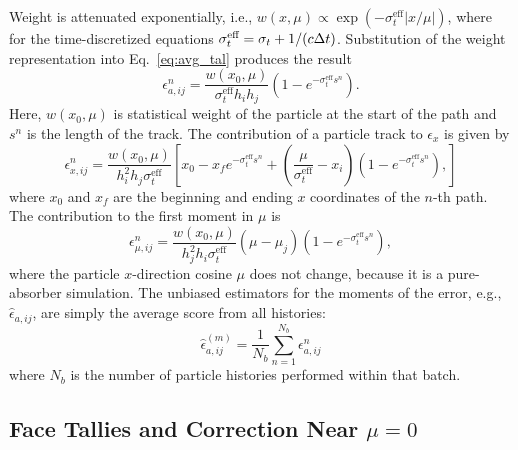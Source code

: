 Weight is attenuated exponentially, i.e., $w(x,\mu)\propto
\exp(-\sigma_{t}^{\text{eff}}|x/\mu|)$, where for the time-discretized equations
$\sigma_{t}^{\text{eff}}=\sigma_t + 1/(c\Delta t)$. Substitution of the weight representation into
Eq.~\eqref{eq:avg_tal} produces the result
\begin{equation}
    \epsilon^n_{a,ij} = \frac{w(x_0,\mu)}{\sigma_{t}^{\text{eff}} h_i h_j} \left(1 -
    e^{-\sigma_{t}^{\text{eff}}s^n}\right).
\end{equation}
Here, $w(x_0,\mu)$ is statistical weight of the particle at the start of the path and $s^n$ is the
length of the track. The contribution of a
particle track to $\epsilon_x$ is given by
\begin{equation}
    \epsilon^n_{x,ij} = \frac{w(x_0,\mu)}{h_i^2h_j \sigma_{t}^{\text{eff}}} \left[x_0 - x_f e^{-\sigma_{t}^{\text{eff}} s^n}
        + \left(\frac{\mu}{\sigma_{t}^{\text{eff}}} - x_i \right)\left(1-e^{-\sigma_{t}^{\text{eff}} s^n}\right),
    \right]
\end{equation}
where $x_0$ and $x_f$ are the beginning and ending $x$ coordinates of the $n$-th
path.  The contribution to the first moment in $\mu$ is 
\begin{equation}
    \epsilon^n_{\mu,ij} = \frac{w(x_0,\mu)}{h_{j}^2h_i\sigma_{t}^{\text{eff}}}\left(\mu -
    \mu_j\right) \left(1 - e^{-\sigma_{t}^{\text{eff}}s^n}\right),
\end{equation}
where the particle $x$-direction cosine $\mu$ does not change, because it is a pure-absorber simulation.
The unbiased estimators for the moments of the error, e.g., $\hat \epsilon_{a,ij}$, are simply the
average score from all histories:
\begin{equation}
    \hat\epsilon_{a,ij}^{(m)}  = \frac{1}{N_b} \sum\limits_{n=1}^{N_b} \epsilon^n_{a,ij}
\end{equation}
where $N_b$ is the number of particle histories performed within that batch.


\subsection{Face Tallies and Correction Near $\mu=0$}
\label{sec:face_tallies}

